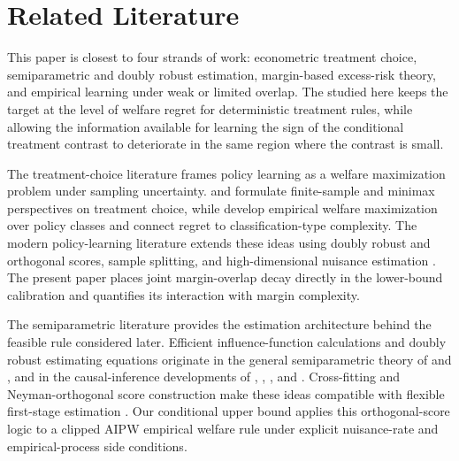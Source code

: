 \section{Related Literature}

This paper is closest to four strands of work: econometric treatment choice, semiparametric and doubly robust estimation, margin-based excess-risk theory, and empirical learning under weak or limited overlap.  The  studied here keeps the target at the level of welfare regret for deterministic treatment rules, while allowing the information available for learning the sign of the conditional treatment contrast to deteriorate in the same region where the contrast is small.

The treatment-choice literature frames policy learning as a welfare maximization problem under sampling uncertainty.  \citet{Manski2004,Manski2009} and \citet{Stoye2009} formulate finite-sample and minimax perspectives on treatment choice, while \citet{Kitagawa2018} develop empirical welfare maximization over policy classes and connect regret to classification-type complexity.  The modern policy-learning literature extends these ideas using doubly robust and orthogonal scores, sample splitting, and high-dimensional nuisance estimation \citep{Athey2021,Chernozhukov2018,Chernozhukov2022}.  The present paper places joint margin-overlap decay directly in the lower-bound calibration and quantifies its interaction with margin complexity.

The semiparametric literature provides the estimation architecture behind the feasible rule considered later.  Efficient influence-function calculations and doubly robust estimating equations originate in the general semiparametric theory of \citet{Bickel1993} and \citet{Newey1994}, and in the causal-inference developments of \citet{Robins1994}, \citet{Hahn1998}, \citet{Hirano2003}, and \citet{VanDerLaan2011}.  Cross-fitting and Neyman-orthogonal score construction make these ideas compatible with flexible first-stage estimation \citep{Chernozhukov2018,Chernozhukov2022}.  Our conditional upper bound applies this orthogonal-score logic to a clipped AIPW empirical welfare rule under explicit nuisance-rate and empirical-process side conditions.

